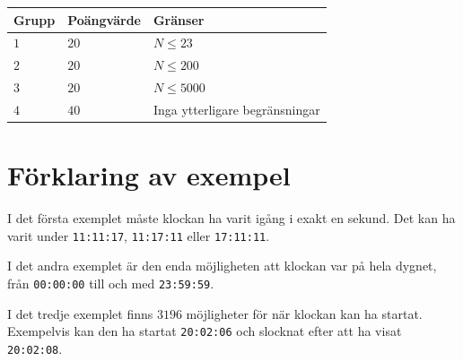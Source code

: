 \noindent
\begin{tabular}{| l | l | l |}
  \hline
  Grupp & Poängvärde & Gränser \\ \hline
  $1$    & $20$        &  $ N \leq 23 $ \\ \hline 
  $2$    & $20$        &  $ N \leq 200 $ \\ \hline
  $3$    & $20$        &  $ N \leq 5000 $ \\ \hline
  $4$    & $40$        &  Inga ytterligare begränsningar \\ \hline
\end{tabular}


\section*{Förklaring av exempel}
I det första exemplet måste klockan ha varit igång i exakt en sekund. Det kan ha varit under \texttt{11:11:17}, \texttt{11:17:11} eller \texttt{17:11:11}.

I det andra exemplet är den enda möjligheten att klockan var på hela dygnet, från \texttt{00:00:00} till och med \texttt{23:59:59}.

I det tredje exemplet finns $3196$ möjligheter för när klockan kan ha startat. Exempelvis kan den ha startat \texttt{20:02:06} och slocknat efter att ha visat \texttt{20:02:08}.
